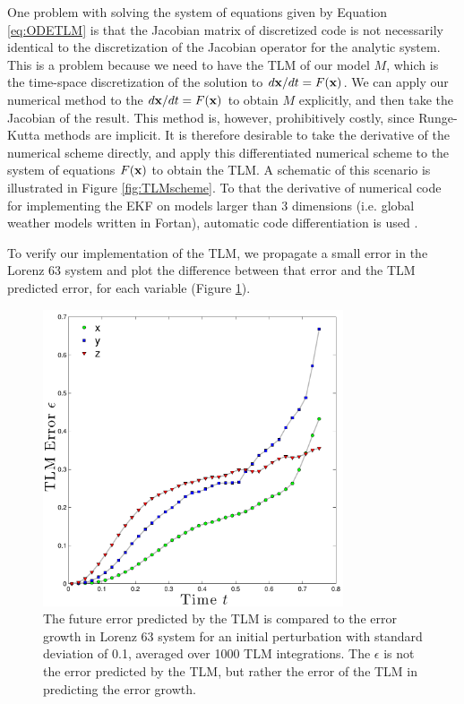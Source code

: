 \documentclass[12pt]{report}
\begin{document}
One problem with solving the system of equations given by Equation \ref{eq:ODETLM} is that the Jacobian matrix of discretized code is not necessarily identical to the discretization of the Jacobian operator for the analytic system.
This is a problem because we need to have the TLM of our model $M$, which is the time-space discretization of the solution to $d\mathbf{x}/dt = F(\mathbf{x})$.
We can apply our numerical method to the $d\mathbf{x}/dt = F(\mathbf{x})$ to obtain $M$ explicitly, and then take the Jacobian of the result.
This method is, however, prohibitively costly, since Runge-Kutta methods are implicit.
It is therefore desirable to take the derivative of the numerical scheme directly, and apply this differentiated numerical scheme to the system of equations $F(\mathbf{x})$ to obtain the TLM.
A schematic of this scenario is illustrated in Figure \ref{fig:TLMscheme}.
To that the derivative of numerical code for implementing the EKF on models larger than 3 dimensions (i.e. global weather models written in Fortan), automatic code differentiation is used .

To verify our implementation of the TLM, we propagate a small error in the Lorenz 63 system and plot the difference between that error and the TLM predicted error, for each variable (Figure \ref{fig:TLMverification}).

\begin{figure}[h!]
  \centering
  \includegraphics[width=0.79\textwidth]{figures/TLM-verification003_noname.pdf}
  \caption[The future error predicted by the TLM is compared to the error growth in Lorenz 63 system for an initial perturbation with standard deviation of 0.1, averaged over 1000 TLM integrations]{
    The future error predicted by the TLM is compared to the error growth in Lorenz 63 system for an initial perturbation with standard deviation of 0.1, averaged over 1000 TLM integrations.
    The $\epsilon$ is not the error predicted by the TLM, but rather the error of the TLM in predicting the error growth.
  }
  \label{fig:TLMverification}
\end{figure}
\end{document}
